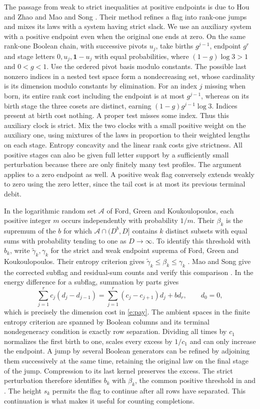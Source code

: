 \documentclass[11pt]{article}
\numberwithin{equation}{section}
\newcommand{\one}{\mathbf 1}
\begin{document}
The passage from weak to strict inequalities at positive endpoints
is due to Hou and Zhao \cite[Theorem~4]{hz} and Mao and Song
\cite[Theorem~3.4]{ms}. Their method refines a flag into rank-one
jumps and mixes its laws with a system having strict slack. We use
an auxiliary system with a positive endpoint even when the original
one ends at zero. On the same rank-one Boolean chain, with successive
pivots $u_j$, take births $g^{j-1}$, endpoint $g^r$ and stage
letters $0,u_j,\one-u_j$ with equal probabilities, where
$(1-g)\log3>1$ and $0<g<1$. Use the ordered pivot basis modulo
constants. The possible last nonzero indices in a nested test
space form a nondecreasing set, whose cardinality is its dimension
modulo constants by elimination. For an index $j$ missing when
born, its entire rank cost including the endpoint is at most
$g^{j-1}$, whereas on its birth stage the three cosets are
distinct, earning $(1-g)g^{j-1}\log3$. Indices present at birth
cost nothing. A proper test misses some index. Thus this auxiliary
clock is strict. Mix the two clocks with a small positive weight
on the auxiliary one, using mixtures of the laws in proportion to
their weighted lengths on each stage. Entropy concavity and the
linear rank costs give strictness. All positive stages can also
be given full letter support by a sufficiently small perturbation
because there are only finitely many test profiles. The argument
applies to a zero endpoint as well. A positive weak flag conversely
extends weakly to zero using the zero letter, since the tail cost
is at most its previous terminal debit.

In the logarithmic random set $\mathcal A$ of Ford, Green and
Koukoulopoulos, each positive integer $m$ occurs independently with
probability $1/m$. Their $\beta_k$ is the supremum of the $b$ for
which $\mathcal A\cap(D^b,D]$ contains $k$ distinct subsets with
equal sums with probability tending to one as $D\to\infty$.
To identify this threshold with $b_k$, write $\widetilde{\gamma}_k,\gamma_k$ for the strict
and weak endpoint suprema of Ford, Green and Koukoulopoulos.
Their entropy criterion gives
$\widetilde{\gamma}_k\le\beta_k\le\gamma_k$
\cite[Theorem~7]{fgk}. Mao and Song give the corrected subflag and
residual-sum counts and verify this comparison
\cite[Lemmas~2.2--2.3 and Proposition~2.4]{ms}. In the energy
difference for a subflag, summation by parts gives
\[
 \sum_{j=1}^r c_j(d_j-d_{j-1})
 =\sum_{j=1}^r(c_j-c_{j+1})d_j+bd_r,\qquad d_0=0,
\]
which is precisely the dimension cost in \eqref{e:pay}.
The ambient spaces in the finite entropy criterion are spanned by
Boolean columns and its terminal nondegeneracy condition is exactly
row separation. Dividing all times by $c_1$ normalizes the first birth to one,
scales every excess by $1/c_1$ and can only increase the endpoint.
A jump by several Boolean generators can be refined by adjoining
them successively at the same time, retaining the original law on
the final stage of the jump. Compression to its last kernel preserves
the excess. The strict perturbation therefore identifies $b_k$ with $\beta_k$,
the common positive threshold in \cite[Theorem~4]{hz} and \cite[Theorem~1.5]{ms}. The height
$s_k$ permits the flag to continue after all rows have separated.
This continuation is what makes it useful for counting completions.
\end{document}
